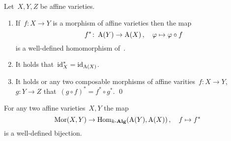 \begin{lemma}
  \label{fuctoriality of the coordinate ring}
  Let~$X, Y, Z$ be affine varieties.
  \begin{enumerate}
    \item
      If~$f \colon X \to Y$ is a morphism of affine varieties then the map
      \[
                f^*
        \colon  \operatorname{A}(Y)
        \to     \operatorname{A}(X) \,,
        \quad   \varphi
        \mapsto \varphi \circ f
      \]
      is a well-defined homomorphism of~.
    \item
      It holds that~$\operatorname{id}_X^* = \operatorname{id}_{\operatorname{A}(X)}$.
    \item
      It holds or any two composable morphisms of affine varities~$f \colon X \to Y$,~$g \colon Y \to Z$ that~$(g \circ f)^* = f^* \circ g^*$.
    \qed
  \end{enumerate}
\end{lemma}


\begin{proposition}
  \label{coordinate ring is fully faithful}
  For any two affine varieties~$X,Y$ the map
  \[
            \operatorname{Mor}(X, Y)
    \to     \operatorname{Hom}_{k\text{-}\mathbf{Alg}}( \operatorname{A}(Y), \operatorname{A}(X) ) \,,
    \quad   f
    \mapsto f^*
  \]
  is a well-defined bijection.
\end{proposition}


